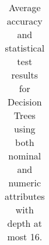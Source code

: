 \begin{table}
\begin{tabular}{c|cc|cc|cc|cc|cc}
\end{tabular}
\caption{Average accuracy and statistical test results for  Decision Trees using both nominal and numeric attributes with depth at most 16.}
\label{exp:numeric-16}
\normalsize
\end{table}

